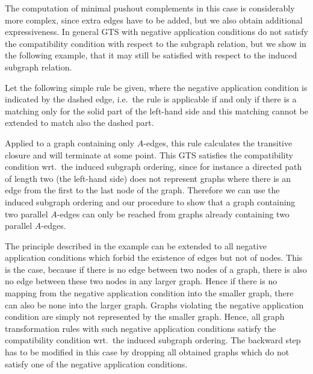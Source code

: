 \documentclass{llncs}
\newcommand*{\graphDiagramScale}{0.75}
\begin{document}

The computation of minimal pushout complements in this case is
considerably more complex, since extra edges have to be added, but we also obtain additional
expressiveness. In general GTS with negative application conditions do not 
satisfy the compatibility condition with respect to the subgraph relation, but 
we show in the following example, that it may still be satisfied with respect 
to the induced subgraph relation.

\begin{example}
  Let the following simple rule be given, where the negative
  application condition is indicated by the dashed edge, i.e.~the rule
  is applicable if and only if there is a matching only for the solid
  part of the left-hand side and this matching cannot be extended to
  match also the dashed part.

  \begin{center}
    \img{\graphDiagramScale}{diagrams/induced-subgraph-example}
  \end{center}
  
  Applied to a graph containing only $A$-edges, this rule calculates
  the transitive closure and will terminate at some point. This GTS
  satisfies the compatibility condition wrt.~the induced subgraph
  ordering, since for instance a directed path of length two (the
  left-hand side) does not represent graphs where there is an edge
  from the first to the last node of the graph.  Therefore we can use
  the induced subgraph ordering and our procedure to show that a graph
  containing two parallel $A$-edges can only be reached from graphs
  already containing two parallel $A$-edges.
\end{example}

The principle described in the example can be extended to all negative
application conditions which forbid the existence of edges but not of
nodes. This is the case, because if there is no edge between two nodes
of a graph, there is also no edge between these two nodes in any
larger graph. Hence if there is no mapping from the negative
application condition into the smaller graph, there can also be none
into the larger graph. Graphs violating the negative application
condition are simply not represented by the smaller graph. Hence, all
graph transformation rules with such negative application conditions
satisfy the compatibility condition wrt.\ the induced subgraph
ordering. The backward step has to be modified in this case by
dropping all obtained graphs which do not satisfy one of the negative
application conditions.
\end{document}

